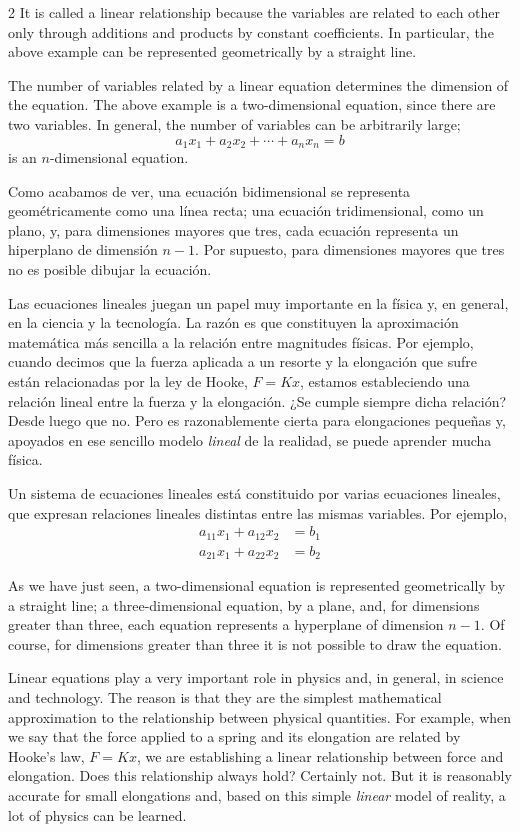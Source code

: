 \begin{paracol}{2}
It is called a linear relationship because the variables are related to each other only through additions and products by constant coefficients. In particular, the above example can be represented geometrically by a straight line.

The number of variables related by a linear equation determines the dimension of the equation. The above example is a two-dimensional equation, since there are two variables. In general, the number of variables can be arbitrarily large;
\begin{equation*}
a_1x_1+a_2x_2+\cdots +a_nx_n=b
\end{equation*}
is an $n$-dimensional equation.

\switchcolumn
Como acabamos de ver, una ecuación bidimensional se representa geométricamente como una línea recta; una ecuación tridimensional, como un plano, y, para dimensiones mayores que tres, cada ecuación representa un hiperplano de dimensión $n-1$. Por supuesto, para dimensiones mayores que tres no es posible dibujar la ecuación.

Las ecuaciones lineales juegan un papel muy importante en la física y, en general, en la ciencia y la tecnología. La razón es que constituyen la aproximación matemática más sencilla a la relación entre magnitudes físicas. Por ejemplo, cuando decimos que la fuerza aplicada a un resorte y la elongación que sufre están relacionadas por la ley de Hooke, $F=Kx$, estamos estableciendo una relación lineal entre la fuerza y la elongación. ¿Se cumple siempre dicha relación? Desde luego que no. Pero es razonablemente cierta para elongaciones pequeñas y, apoyados en ese sencillo modelo \emph{lineal} de la realidad, se puede aprender mucha física.

Un sistema de ecuaciones lineales está constituido por varias ecuaciones lineales, que expresan relaciones lineales distintas entre las mismas variables. Por ejemplo,
\begin{align*}
a_{11}x_1+a_{12}x_2&=b_1\\
a_{21}x_1+a_{22}x_2&=b_2
\end{align*}

\switchcolumn
As we have just seen, a two-dimensional equation is represented geometrically by a straight line; a three-dimensional equation, by a plane, and, for dimensions greater than three, each equation represents a hyperplane of dimension $n-1$. Of course, for dimensions greater than three it is not possible to draw the equation.

Linear equations play a very important role in physics and, in general, in science and technology. The reason is that they are the simplest mathematical approximation to the relationship between physical quantities. For example, when we say that the force applied to a spring and its elongation are related by Hooke's law, $F=Kx$, we are establishing a linear relationship between force and elongation. Does this relationship always hold? Certainly not. But it is reasonably accurate for small elongations and, based on this simple \emph{linear} model of reality, a lot of physics can be learned.


\end{paracol}
